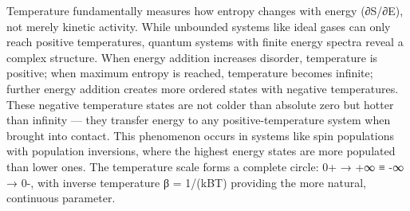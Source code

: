 Temperature fundamentally measures how entropy changes with energy (∂S/∂E), not merely kinetic activity. While unbounded systems like ideal gases can only reach positive temperatures, quantum systems with finite energy spectra reveal a complex structure. When energy addition increases disorder, temperature is positive; when maximum entropy is reached, temperature becomes infinite; further energy addition creates more ordered states with negative temperatures. These negative temperature states are not colder than absolute zero but hotter than infinity — they transfer energy to any positive-temperature system when brought into contact. This phenomenon occurs in systems like spin populations with population inversions, where the highest energy states are more populated than lower ones. The temperature scale forms a complete circle: 0+ → +∞ ≡ -∞ → 0-, with inverse temperature β = 1/(kBT) providing the more natural, continuous parameter.
